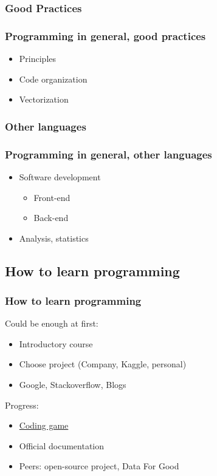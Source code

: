 \subsubsection{Good Practices}

\begin{frame}\frametitle{Programming in general, good practices}

   \begin{itemize}
      \item Principles
      \item Code organization
      \item Vectorization
   \end{itemize}

\end{frame}


\subsubsection{Other languages}

\begin{frame}\frametitle{Programming in general, other languages}

   \begin{itemize}
      \item Software development
      \begin{itemize}
         \item Front-end
         \item Back-end
      \end{itemize}
      \item Analysis, statistics
   \end{itemize}

\end{frame}

\subsection{How to learn programming}

\begin{frame}\frametitle{How to learn programming}
   \item Could be enough at first:
   \begin{itemize}
      \item Introductory course
      \item Choose project (Company, Kaggle, personal)
      \item Google, Stackoverflow, Blogs
   \end{itemize}

   \item Progress:
   \begin{itemize}
      \item \href{https://www.codingame.com/home}{Coding game}
      \item Official documentation
      \item Peers: open-source project, Data For Good
   \end{itemize}
\end{frame}


